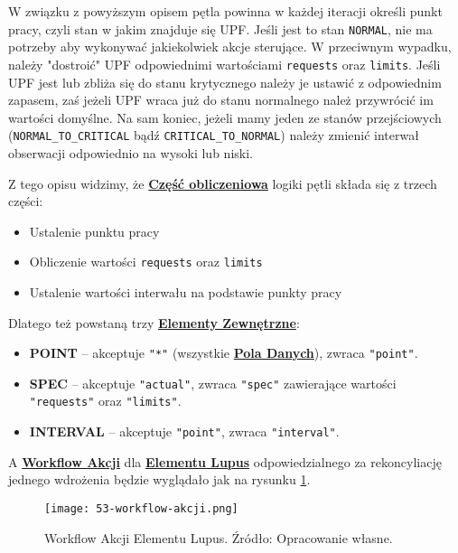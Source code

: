 W związku z powyższym opisem pętla powinna w każdej iteracji określi punkt pracy, czyli stan w jakim znajduje się UPF. Jeśli jest to stan \texttt{NORMAL}, nie ma potrzeby aby wykonywać jakiekolwiek akcje sterujące. W przeciwnym wypadku, należy "dostroić" UPF odpowiednimi wartościami \texttt{requests} oraz \texttt{limits}. Jeśli UPF jest lub zbliża się do stanu krytycznego należy je ustawić z odpowiednim zapasem, zaś jeżeli UPF wraca już do stanu normalnego należ przywrócić im wartości domyślne. Na sam koniec, jeżeli mamy jeden ze stanów przejściowych (\texttt{NORMAL\_TO\_CRITICAL} bądź \texttt{CRITICAL\_TO\_NORMAL}) należy zmienić interwał obserwacji odpowiednio na wysoki lub niski.

Z tego opisu widzimy, że \hyperlink{def:czesc-obliczeniowa}{\textbf{Część obliczeniowa}} logiki pętli składa się z trzech części:
\begin{itemize}
    \item Ustalenie punktu pracy 
    \item Obliczenie wartości \texttt{requests} oraz \texttt{limits}
    \item Ustalenie wartości interwału na podstawie punkty pracy
\end{itemize}

Dlatego też powstaną trzy \hyperlink{def:element-zewnetrzny}{\textbf{Elementy Zewnętrzne}}:
\begin{itemize}
    \item \textbf{POINT} – akceptuje \texttt{"*"} (wszystkie \hyperlink{def:pole-danych}{\textbf{Pola Danych}}), zwraca \texttt{"point"}.
    \item \textbf{SPEC} – akceptuje \texttt{"actual"}, zwraca \texttt{"spec"} zawierające wartości \texttt{"requests"} oraz \texttt{"limits"}.
    \item \textbf{INTERVAL} – akceptuje \texttt{"point"}, zwraca \texttt{"interval"}.
\end{itemize}

A \hyperlink{def:workflow-petli}{\textbf{Workflow Akcji}} dla \hyperlink{def:element-lupus}{\textbf{Elementu Lupus}} odpowiedzialnego za rekoncyliację jednego wdrożenia będzie wyglądało jak na rysunku \ref{fig:53-workflow-akcji}.

\begin{figure}[!h]
    \centering \texttt{[image: 53-workflow-akcji.png]}
    \caption{Workflow Akcji Elementu Lupus. Źródło: Opracowanie własne.}\label{fig:53-workflow-akcji}
\end{figure}

